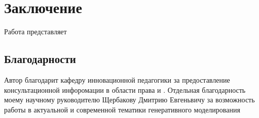 \section{Заключение}

Работа представляет

\subsection{Благодарности}

Автор благодарит кафедру инновационной педагогики за предоставление консультационной инфоромации в области права
и . Отдельная благодарность моему научному руководителю Щербакову Дмитрию Евгеньвичу
за возможность работы в актуальной и современной тематики генеративного моделирования